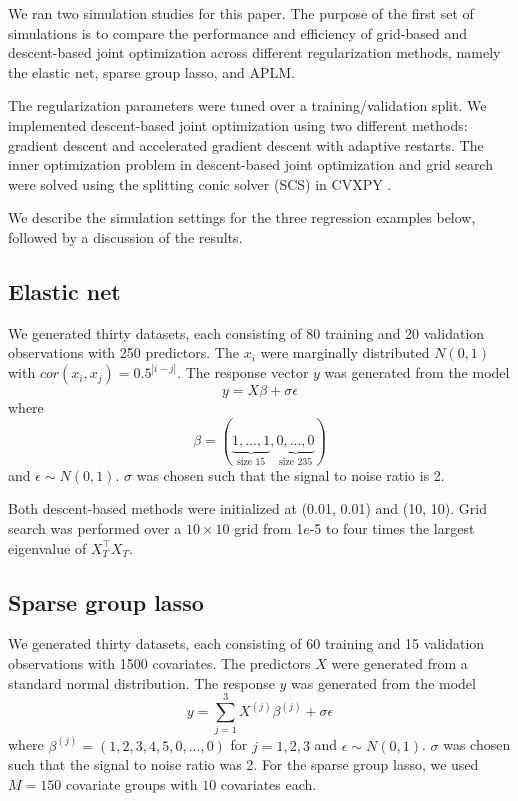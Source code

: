 \documentclass[10pt,letterpaper]{article}
\begin{document}
We ran two simulation studies for this paper. The purpose of the first set of simulations is to compare the performance and efficiency of grid-based and descent-based joint optimization across different regularization methods, namely the elastic net, sparse group lasso, and APLM.

The regularization parameters were tuned over a training/validation split. We implemented descent-based joint optimization using two different methods:  gradient descent and accelerated gradient descent with adaptive restarts. The inner optimization problem in descent-based joint optimization and grid search were solved using the splitting conic solver (SCS) in CVXPY \citep{cvxpy}.

We describe the simulation settings for the three regression examples below, followed by a discussion of the results.

\subsection{Elastic net}
We generated thirty datasets, each consisting of 80 training and 20 validation observations with 250 predictors. The $x_i$ were marginally distributed $N(0,1)$ with $cor(x_i,x_j) = 0.5^{|i-j|}$.
The response vector $y$ was generated from the model
\begin{equation}
y = X\beta + \sigma \epsilon
\end{equation}
where
\begin{equation}
\beta = (\underbrace{1, ..., 1}_\text{size 15}, \underbrace{0, ..., 0}_\text{size 235})
\end{equation}
and $\epsilon \sim N(0, 1)$. $\sigma$ was chosen such that the signal to noise ratio is 2. 

Both descent-based methods were initialized at (0.01, 0.01) and (10, 10). Grid search was performed over a $10 \times 10$ grid from 1$e$-5 to four times the largest eigenvalue of $X_T^\top X_T$.

\subsection{Sparse group lasso}\label{sec:simulationSGL}

We generated thirty datasets, each consisting of 60 training and 15 validation observations with 1500 covariates. The predictors $X$ were generated from a standard normal distribution. The response $y$ was generated from the model
\begin{equation}
y = \sum\limits_{j=1}^3 X^{(j)} \beta^{(j)} + \sigma \epsilon
\end{equation}
where $\beta^{(j)} = (1, 2, 3, 4, 5, 0, ..., 0)$ for $j = 1, 2, 3$ and $\epsilon \sim N(0, 1)$. $\sigma$ was chosen such that the signal to noise ratio was 2. For the sparse group lasso, we used $M=150$ covariate groups with $10$ covariates each.
\end{document}
